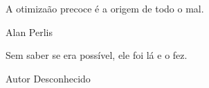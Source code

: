 \null %
\vfill
\epigraph{A otimiza\cc\~ao precoce \'e a origem de todo o mal.}{Alan Perlis}
\epigraph{Sem saber se era poss\'ivel, ele foi l\'a e o fez.}{Autor Desconhecido}
